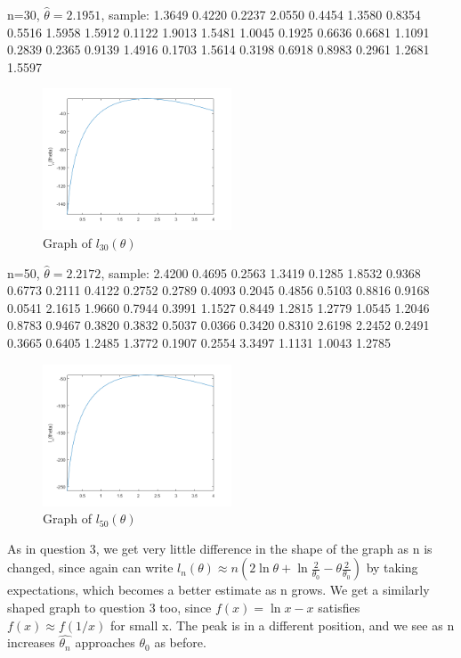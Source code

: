 \documentclass[10pt,a4paper]{report}
\begin{document}
n=30, $\hat{\theta}=2.1951$, sample: 1.3649	0.4220	0.2237	2.0550	0.4454	1.3580	0.8354	0.5516	1.5958	1.5912	0.1122	1.9013	1.5481	1.0045	0.1925	0.6636	0.6681	1.1091	0.2839	0.2365	0.9139	1.4916	0.1703	1.5614	0.3198	0.6918	0.8983	0.2961	1.2681	1.5597

\begin{figure}[ht]
\centering
\includegraphics[width=0.5\textwidth]{q7n30.png}
\caption{Graph of $l_{30}(\theta)$ }
\end{figure}

n=50, $\hat{\theta}=2.2172$, sample: 2.4200	0.4695	0.2563	1.3419	0.1285	1.8532	0.9368	0.6773	0.2111	0.4122	0.2752	0.2789	0.4093	0.2045	0.4856	0.5103	0.8816	0.9168	0.0541	2.1615	1.9660	0.7944	0.3991	1.1527	0.8449	1.2815	1.2779	1.0545	1.2046	0.8783	0.9467	0.3820	0.3832	0.5037	0.0366	0.3420	0.8310	2.6198	2.2452	0.2491	0.3665	0.6405	1.2485	1.3772	0.1907	0.2554	3.3497	1.1131	1.0043	1.2785

 

\begin{figure}[ht]
\centering
\includegraphics[width=0.5\textwidth]{q7n50.png}
\caption{Graph of $l_{50}(\theta)$ }
\end{figure}

\vspace{5mm}

As in question 3, we get very little difference in the shape of the graph as n is changed, since again can write $l_n(\theta)\approx n(2\ln\theta + \ln\frac{2}{\theta_0} -\theta\frac{2}{\theta_0})$ by taking expectations, which becomes a better estimate as n grows. We get a similarly shaped graph to question 3 too, since $f(x)=\ln x -x$ satisfies $f(x)\approx f(1/x)$ for small x. The peak is in a different position, and we see as n increases $\hat{\theta_n}$ approaches $\theta_0$ as before.
\end{document}
